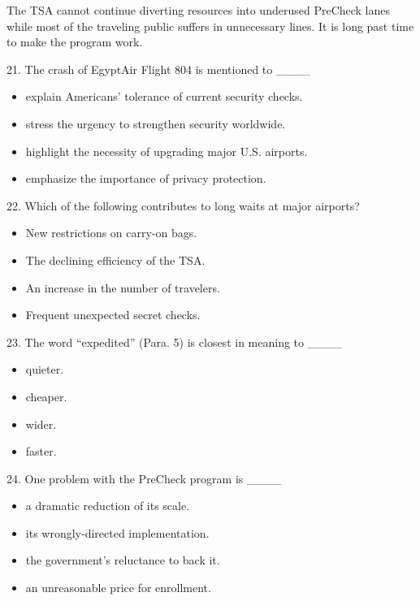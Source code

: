 \documentclass[UTF8,11pt]{ctexart}
\begin{document}
The TSA cannot continue diverting resources into underused PreCheck lanes while most of the traveling public suffers in unnecessary lines. It is long past time to make the program work.


21. The crash of EgyptAir Flight 804 is mentioned to \_\_\_\_


\begin{itemize}[leftmargin=2em,itemsep=.2em,topsep=.4em]\item[A.] explain Americans’ tolerance of current security checks.
\item[B.] stress the urgency to strengthen security worldwide.
\item[C.] highlight the necessity of upgrading major U.S. airports.
\item[D.] emphasize the importance of privacy protection.
\end{itemize}

22. Which of the following contributes to long waits at major airports?


\begin{itemize}[leftmargin=2em,itemsep=.2em,topsep=.4em]\item[A.] New restrictions on carry-on bags.
\item[B.] The declining efficiency of the TSA.
\item[C.] An increase in the number of travelers.
\item[D.] Frequent unexpected secret checks.
\end{itemize}

23. The word “expedited” (Para. 5) is closest in meaning to \_\_\_\_


\begin{itemize}[leftmargin=2em,itemsep=.2em,topsep=.4em]\item[A.] quieter.
\item[B.] cheaper.
\item[C.] wider.
\item[D.] faster.
\end{itemize}

24. One problem with the PreCheck program is \_\_\_\_


\begin{itemize}[leftmargin=2em,itemsep=.2em,topsep=.4em]\item[A.] a dramatic reduction of its scale.
\item[B.] its wrongly-directed implementation.
\item[C.] the government’s reluctance to back it.
\item[D.] an unreasonable price for enrollment.
\end{itemize}
\end{document}
